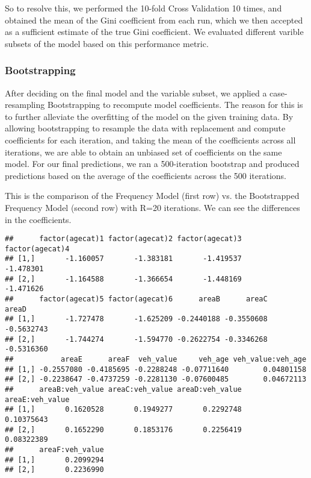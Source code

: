 \documentclass[a4paper]{article}\usepackage[]{graphicx}\usepackage[]{color}
\makeatletter
\newenvironment{kframe}{%
 \def\at@end@of@kframe{}%
 \ifinner\ifhmode%
  \def\at@end@of@kframe{\end{minipage}}%
  \begin{minipage}{\columnwidth}%
 \fi\fi%
 \def\FrameCommand##1{\hskip\@totalleftmargin \hskip-\fboxsep
 \colorbox{shadecolor}{##1}\hskip-\fboxsep
     \hskip-\linewidth \hskip-\@totalleftmargin \hskip\columnwidth}%
 \MakeFramed {\advance\hsize-\width
   \@totalleftmargin\z@ \linewidth\hsize
   \@setminipage}}%
 {\par\unskip\endMakeFramed%
 \at@end@of@kframe}
\newenvironment{knitrout}{}{} %
\makeatother
\begin{document}
So to resolve this, we performed the 10-fold Cross Validation 10 times, and obtained the mean of the Gini coefficient from each run, which we then accepted as a sufficient estimate of the true Gini coefficient. We evaluated different varible subsets of the model based on this performance metric.

\subsubsection*{Bootstrapping}

After deciding on the final model and the variable subset, we applied a case-resampling Bootstrapping to recompute model coefficients. The reason for this is to further alleviate the overfitting of the model on the given training data. By allowing bootstrapping to resample the data with replacement and compute coefficients for each iteration, and taking the mean of the coefficients across all iterations, we are able to obtain an unbiased set of coefficients on the same model. For our final predictions, we ran a 500-iteration bootstrap and produced predictions based on the average of the coefficients across the 500 iterations.

This is the comparison of the Frequency Model (first row) vs. the Bootstrapped Frequency Model (second row) with R=20 iterations. We can see the differences in the coefficients.

\begin{knitrout}
\color{fgcolor}\begin{kframe}
\begin{verbatim}
##      factor(agecat)1 factor(agecat)2 factor(agecat)3 factor(agecat)4
## [1,]       -1.160057       -1.383181       -1.419537       -1.478301
## [2,]       -1.164588       -1.366654       -1.448169       -1.471626
##      factor(agecat)5 factor(agecat)6      areaB      areaC      areaD
## [1,]       -1.727478       -1.625209 -0.2440188 -0.3550608 -0.5632743
## [2,]       -1.744274       -1.594770 -0.2622754 -0.3346268 -0.5316360
##           areaE      areaF  veh_value     veh_age veh_value:veh_age
## [1,] -0.2557080 -0.4185695 -0.2288248 -0.07711640        0.04801158
## [2,] -0.2238647 -0.4737259 -0.2281130 -0.07600485        0.04672113
##      areaB:veh_value areaC:veh_value areaD:veh_value areaE:veh_value
## [1,]       0.1620528       0.1949277       0.2292748      0.10375643
## [2,]       0.1652290       0.1853176       0.2256419      0.08322389
##      areaF:veh_value
## [1,]       0.2099294
## [2,]       0.2236990
\end{verbatim}
\end{kframe}
\end{knitrout}
\end{document}
